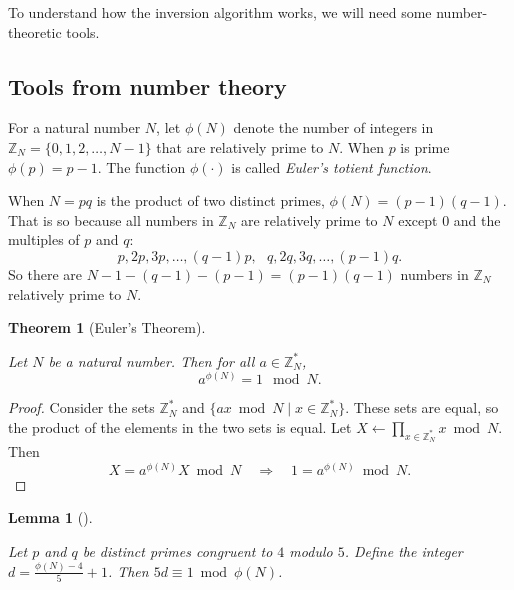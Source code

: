 \documentclass[
  letterpaper,
]{scrbook}
\newcommand{\Z}{\mathbb{Z}}
\theoremstyle{definition}
\theoremstyle{plain}
\newtheorem{lemma}{Lemma}[chapter]
\theoremstyle{plain}
\newtheorem{theorem}{Theorem}[chapter]
\theoremstyle{remark}
\begin{document}
To understand how the inversion algorithm works, we will need some
number-theoretic tools.

\subsection{Tools from number theory}\label{tools-from-number-theory}

For a natural number \(N\), let \(\phi(N)\) denote the number of
integers in \(\Z_N = \{0, 1, 2, \dots, N-1\}\) that are relatively prime
to \(N\). When \(p\) is prime \(\phi(p) = p-1\). The function
\(\phi(\cdot)\) is called \emph{Euler's totient function}.


When \(N=pq\) is the product of two distinct primes,
\(\phi(N) = (p-1)(q-1)\). That is so because all numbers in \(\Z_N\) are
relatively prime to \(N\) except \(0\) and the multiples of \(p\) and
\(q\): \[ p, 2p, 3p, \dots, (q-1)p,\ \ \ q, 2q, 3q, \dots, (p-1)q.\] So
there are \(N - 1 - (q-1) - (p-1) = (p-1)(q-1)\) numbers in \(\Z_N\)
relatively prime to \(N\).

\begin{theorem}[Euler's
Theorem]\protect\hypertarget{thm-euler}{}\label{thm-euler}

Let \(N\) be a natural number. Then for all \(a \in \Z^*_N\),
\[ a^{\phi(N)} = 1 \mod N.\]

\end{theorem}

\begin{proof}
Consider the sets \(\Z^*_N\) and \(\{ax \bmod N \mid x \in \Z^*_N\}\).
These sets are equal, so the product of the elements in the two sets is
equal. Let \(X \gets \prod_{x \in \Z^*_N} x \bmod N\). Then
\[ X = a^{\phi(N)}X \bmod N \quad \Rightarrow\quad 1 = a^{\phi(N)} \bmod N.\]
\end{proof}

\begin{lemma}[]\protect\hypertarget{lem-inv}{}\label{lem-inv}

Let \(p\) and \(q\) be distinct primes congruent to \(4\) modulo \(5\).
Define the integer \(d = \frac{\phi(N) - 4}{5} + 1\). Then
\(5d \equiv 1 \bmod \phi(N)\).

\end{lemma}
\end{document}
